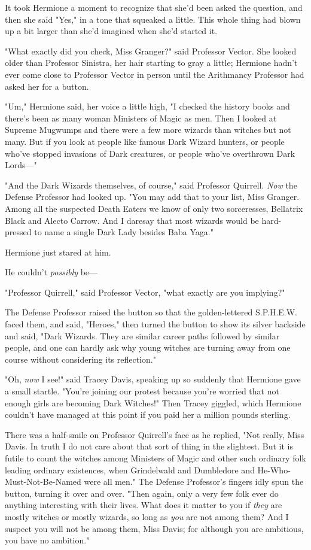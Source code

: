 It took Hermione a moment to recognize that she'd been asked the question, and then she said "Yes," in a tone that squeaked a little. This whole thing had blown up a bit larger than she'd imagined when she'd started it.

"What exactly did you check, Miss Granger?" said Professor Vector. She looked older than Professor Sinistra, her hair starting to gray a little; Hermione hadn't ever come close to Professor Vector in person until the Arithmancy Professor had asked her for a button.

"Um," Hermione said, her voice a little high, "I checked the history books and there's been as many woman Ministers of Magic as men. Then I looked at Supreme Mugwumps and there were a few more wizards than witches but not many. But if you look at people like famous Dark Wizard hunters, or people who've stopped invasions of Dark creatures, or people who've overthrown Dark Lords---"

"And the Dark Wizards themselves, of course," said Professor Quirrell. \emph{Now} the Defense Professor had looked up. "You may add that to your list, Miss Granger. Among all the suspected Death Eaters we know of only two sorceresses, Bellatrix Black and Alecto Carrow. And I daresay that most wizards would be hard-pressed to name a single Dark Lady besides Baba Yaga."

Hermione just stared at him.

He couldn't \emph{possibly} be---

"Professor Quirrell," said Professor Vector, "what exactly are you implying?"

The Defense Professor raised the button so that the golden-lettered S.P.H.E.W. faced them, and said, "Heroes," then turned the button to show its silver backside and said, "Dark Wizards. They are similar career paths followed by similar people, and one can hardly ask why young witches are turning away from one course without considering its reflection."

"Oh, \emph{now} I see!" said Tracey Davis, speaking up so suddenly that Hermione gave a small startle. "You're joining our protest because you're worried that not enough girls are becoming Dark Witches!" Then Tracey giggled, which Hermione couldn't have managed at this point if you paid her a million pounds sterling.

There was a half-smile on Professor Quirrell's face as he replied, "Not really, Miss Davis. In truth I do not care about that sort of thing in the slightest. But it is futile to count the witches among Ministers of Magic and other such ordinary folk leading ordinary existences, when Grindelwald and Dumbledore and He-Who-Must-Not-Be-Named were all men." The Defense Professor's fingers idly spun the button, turning it over and over. "Then again, only a very few folk ever do anything interesting with their lives. What does it matter to you if \emph{they} are mostly witches or mostly wizards, so long as \emph{you} are not among them? And I suspect you will not be among them, Miss Davis; for although you are ambitious, you have no ambition."

